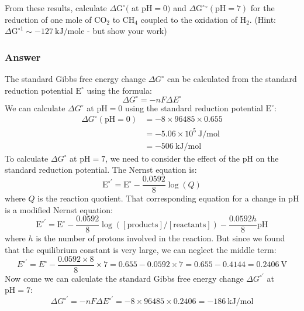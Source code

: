 \documentclass[12pt]{article}
\begin{document}
From these results, calculate $\Delta \mathrm{G}^{\circ}($ at $\mathrm{pH}=0)$ and $\Delta \mathrm{G}^{\circ}{ }^{\circ}(\mathrm{pH}=7)$ for the reduction of one mole of $\mathrm{CO}_{2}$ to $\mathrm{CH}_{4}$ coupled to the oxidation of $\mathrm{H}_{2}$. (Hint: $\Delta \mathrm{G}^{\circ 1} \sim-127 \mathrm{~kJ} / \mathrm{mole}$ - but show your work)
\subsubsection{Answer}
The standard Gibbs free energy change $\Delta G^{\circ}$ can be calculated from the standard reduction potential $\mathrm{E}^{\circ}$ using the formula:
\begin{equation}
\Delta G^{\circ}=-n F \Delta E^{\circ}
\end{equation}
We can calculate $\Delta G^{\circ}$ at $\mathrm{pH}=0$ using the standard reduction potential $\mathrm{E}^{\circ}$:
\begin{equation}
\begin{aligned}
\Delta G^{\circ}(\mathrm{pH}=0) &=-8 \times 96485 \times 0.655 \\
&=-5.06 \times 10^{5} \mathrm{~J} / \mathrm{mol} \\
&=-506 \mathrm{~kJ} / \mathrm{mol}
\end{aligned}
\end{equation}
To calculate $\Delta G^{\circ}$ at $\mathrm{pH}=7$, we need to consider the effect of the pH on the standard reduction potential. The Nernst equation is:
\begin{equation}
\mathrm{E}^{\circ \prime}=\mathrm{E}^{\circ}-\frac{0.0592}{8} \log \left(Q\right)
\end{equation}
where $Q$ is the reaction quotient. That corresponding equation for a change in pH is a modified Nernst equation:
\begin{equation}
\mathrm{E}^{\circ \prime}=\mathrm{E}^{\circ}-\frac{0.0592}{8} \log \left([\text{products}]/[\text{reactants}]\right) - \frac{0.0592 h}{8} \text{pH}
\end{equation}
where $h$ is the number of protons involved in the reaction. But since we found that the equilibrium constant is very large, we can neglect the middle term:
\begin{equation}
E^{\circ \prime}=E^{\circ}-\frac{0.0592\times 8}{8}\times 7 = 0.655-0.0592\times 7 = 0.655-0.4144 = 0.2406 \mathrm{~V}
\end{equation}
Now come we can calculate the standard Gibbs free energy change $\Delta G^{\circ \prime}$ at $\mathrm{pH}=7$:
\begin{equation}
\Delta G^{\circ \prime} = -n F \Delta E^{\circ \prime} = -8 \times 96485 \times 0.2406 = -186 \mathrm{~kJ} / \mathrm{mol}
\end{equation}
\end{document}
